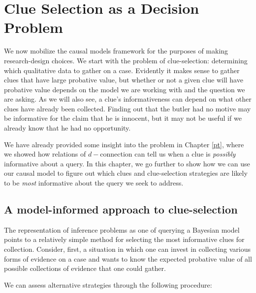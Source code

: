 \documentclass[
  12pt,
]{book}
\begin{document}
\hypertarget{clue}{%
\chapter{Clue Selection as a Decision Problem}\label{clue}}

We now mobilize the causal models framework for the purposes of making research-design choices. We start with the problem of clue-selection: determining which qualitative data to gather on a case. Evidently it makes sense to gather clues that have large probative value, but whether or not a given clue will have probative value depends on the model we are working with and the question we are asking. As we will also see, a clue's informativeness can depend on what other clues have already been collected. Finding out that the butler had no motive may be informative for the claim that he is innocent, but it may not be useful if we already know that he had no opportunity.

We have already provided some insight into the problem in Chapter \ref{pt}, where we showed how relations of \(d-\)connection can tell us when a clue is \emph{possibly} informative about a query. In this chapter, we go further to show how we can use our causal model to figure out which clues and clue-selection strategies are likely to be \emph{most} informative about the query we seek to address.

\hypertarget{a-model-informed-approach-to-clue-selection}{%
\section{A model-informed approach to clue-selection}\label{a-model-informed-approach-to-clue-selection}}

The representation of inference problems as one of querying a Bayesian model points to a relatively simple method for selecting the most informative clues for collection. Consider, first, a situation in which one can invest in collecting various forms of evidence on a case and wants to know the expected probative value of all possible collections of evidence that one could gather.

We can assess alternative strategies through the following procedure:
\end{document}

